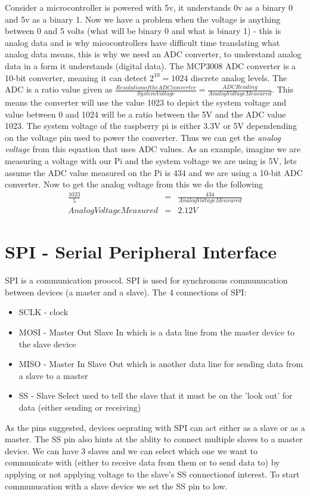 \documentclass{article}
\begin{document}
	Consider a microcontroller is powered with 5v, it understands 0v as a binary 0 and 5v as a binary 1. Now we have a problem when the voltage is anything between 0 and 5 volts (what will be binary 0 and what is binary 1) - this is analog data and is why micocontrollers have difficult time translating what analog data means, this is why we need an ADC converter, to understand analog data in a form it understands (digital data). The MCP3008 ADC converter is a 10-bit converter, meaning it can detect $2^{10} = 1024$ discrete analog levels. The ADC is a ratio value given as $\frac{Resolution of the ADC converter}{System Voltage} = \frac{ADC Reading}{Analog Voltage Measured}$. This means the converter will use the value 1023 to depict the system voltage and value between 0 and 1024 will be a ratio between the 5V and the ADC value 1023. The system voltage of the raspberry pi is either 3.3V or 5V dependending on the voltage pin used to power the converter. Thus we can get the \textit{analog voltage} from this equation that uses ADC values. As an example, imagine we are measuring a voltage with our Pi and the system voltage we are using is 5V, lets assume the ADC value measured on the Pi is 434 and we are using a 10-bit ADC converter. Now to get the analog voltage from this we do the following
	\begin{equation}
		\begin{array}{ccc}
			\frac{1023}{5} & = & \frac{434}{Analog Voltage Measured}\\
	 		Analog Voltage Measured & = & 2.12V
		\end{array}
	 \end{equation} 
	

	\section{SPI - Serial Peripheral Interface} %
	\label{sec:spi_serial_peripheral_interface}
	SPI is a communication proocol. SPI is used for synchronous communucation between devices (a master and a slave). The 4 connections of SPI:
	\begin{itemize}
		\item SCLK - clock 
		\item MOSI - Master Out Slave In which is a data line from the master device to the slave device
		\item MISO - Master In Slave Out which is another data line for sending data from a slave to a master
		\item SS - Slave Select used to tell the slave that it must be on the 'look out' for data (either sending or receiving)
	\end{itemize}
	As the pins suggested, devices oeprating with SPI can act either as a slave or as a master. The SS pin also hints at the ablity to connect multiple slaves to a master device. We can have 3 slaves and we can select which one we want to communicate with (either to receive data from them or to send data to) by applying or not applying voltage to the slave's SS connectionof interest. To start communucation with a slave device we set the SS pin to low.
\end{document}
